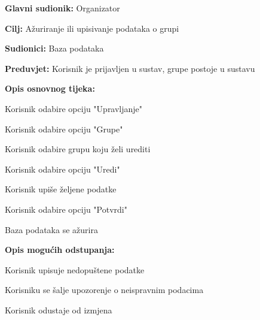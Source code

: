 \begin{packed_item}
\begin{packed_item}
\begin{packed_item}
\begin{packed_enum}
							\end{packed_enum}						
						\end{packed_item}
					\end{packed_item}
				
					\noindent {}
					\begin{packed_item}
						
						\item \textbf{Glavni sudionik: } Organizator
						\item  \textbf{Cilj:} Ažuriranje ili upisivanje podataka o grupi
						\item  \textbf{Sudionici:} Baza podataka
						\item  \textbf{Preduvjet:} Korisnik je prijavljen u sustav, grupe postoje u sustavu
						\item  \textbf{Opis osnovnog tijeka:}
						
						\item[] \begin{packed_enum}
							
							\item Korisnik odabire opciju "Upravljanje"
							\item Korisnik odabire opciju "Grupe"
							\item Korisnik odabire grupu koju želi urediti
							\item Korisnik odabire opciju "Uredi"
							\item Korisnik upiše željene podatke
							\item Korisnik odabire opciju "Potvrdi"
							\item Baza podataka se ažurira
						\end{packed_enum}
						
						\item  \textbf{Opis mogućih odstupanja:}
						
						\item[] \begin{packed_item}
							
							\item[5.a] Korisnik upisuje nedopuštene podatke
							\item[] \begin{packed_enum}
								
								\item Korisniku se šalje upozorenje o neispravnim podacima
								
							\end{packed_enum}
							\item[5.b] Korisnik odustaje od izmjena
							\item [] \begin{packed_enum}
								

\end{packed_enum}
\end{packed_item}
\end{packed_item}
\end{packed_item}
